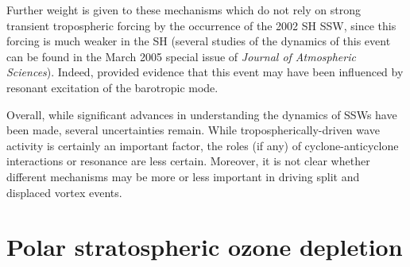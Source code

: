 Further weight is given to these mechanisms which do not rely on strong
transient tropospheric forcing by the occurrence of the 2002 SH SSW, since this
forcing is much weaker in the SH (several studies of the dynamics of this event
can be found in the March 2005 special issue of \emph{Journal of Atmospheric
  Sciences}). Indeed, \citet{Esler2006} provided evidence that this event may
have been influenced by resonant excitation of the barotropic mode.


Overall, while significant advances in understanding the dynamics of SSWs have
been made, several uncertainties remain. While tropospherically-driven wave
activity is certainly an important factor, the roles (if any) of
cyclone-anticyclone interactions or resonance are less certain. Moreover, it is
not clear whether different mechanisms may be more or less important in driving
split and displaced vortex events.


\section{Polar stratospheric ozone depletion}
\label{sec:polar-strat-ozone}

